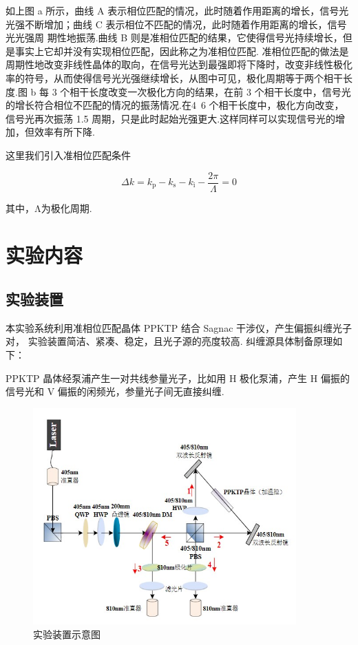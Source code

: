 \documentclass[a4paper,UTF8]{ctexart}
\begin{document}
如上图 a 所示，曲线 A 表示相位匹配的情况，此时随着作用距离的增长，信号光光强不断增加；曲线 C 表示相位不匹配的情况，此时随着作用距离的增长，信号光光强周
 期性地振荡.曲线 B 则是准相位匹配的结果，它使得信号光持续增长，但是事实上它却并没有实现相位匹配，因此称之为准相位匹配. 准相位匹配的做法是周期性地改变非线性晶体的取向，在信号光达到最强即将下降时，改变非线性极化率的符号，从而使得信号光光强继续增长，从图中可见，极化周期等于两个相干长度.图 b 每 3 个相干长度改变一次极化方向的结果，在前 3 个相干长度中，信号光的增长符合相位不匹配的情况的振荡情况.在4~6 个相干长度中，极化方向改变，信号光再次振荡 1.5 周期，只是此时起始光强更大.这样同样可以实现信号光的增加，但效率有所下降.

这里我们引入准相位匹配条件

$$
\Delta k=k_\mathrm{p}-k_\mathrm{s}-k_\mathrm{i}-\frac{2\pi}\Lambda=0
$$

其中，Λ为极化周期.

\section{实验内容}

\subsection{实验装置}

本实验系统利用准相位匹配晶体 PPKTP 结合 Sagnac 干涉仪，产生偏振纠缠光子对， 实验装置简洁、紧凑、稳定，且光子源的亮度较高. 纠缠源具体制备原理如下：

PPKTP 晶体经泵浦产生一对共线参量光子，比如用 H 极化泵浦，产生 H 偏振的信号光和 V 偏振的闲频光，参量光子间无直接纠缠.

\begin{figure}[H]
    \centering
    \begin{minipage}[b]{0.9\textwidth}
        \centering
        \includegraphics[width=0.9\textwidth]{./fig2.jpg}
        \caption{实验装置示意图}
    \end{minipage}
\end{figure}
\end{document}
